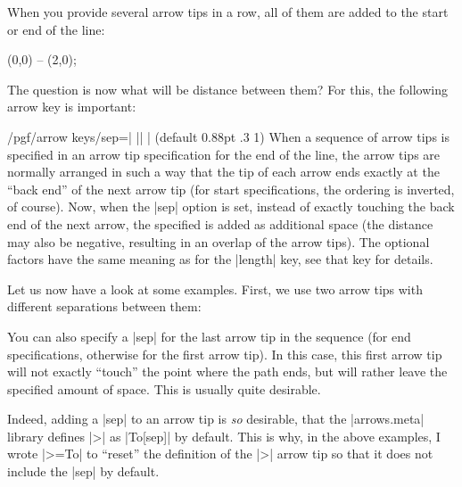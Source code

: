 When you provide several arrow tips in a row, all of them are added to
the start or end of the line:
\begin{codeexample}[]
\tikz \draw [<<<->>>>] (0,0) -- (2,0);
\end{codeexample}
The question is now what will be distance between them? For this, the
following arrow key is important:
\begin{key}{/pgf/arrow keys/sep=| || | (default 0.88pt .3 1)}
  When a sequence of arrow tips is specified in an arrow tip
  specification for the end of the line, the arrow tips are normally
  arranged in such a way that the tip of each arrow ends exactly at
  the ``back end'' of the next arrow tip (for start specifications,
  the ordering is inverted, of course). Now, when the |sep| option is
  set, instead of exactly touching the back end of the next arrow, the
  specified  is added as additional space (the
  distance may also be negative, resulting in an overlap of the arrow
  tips). The optional factors have the same meaning as for the
  |length| key, see that key for details.

  Let us now have a look at some examples. First, we use two arrow
  tips with different separations between them:
\begin{codeexample}[]
\end{codeexample}

  You can also specify a |sep| for the last arrow tip in the sequence
  (for end specifications, otherwise for the first arrow tip). In this
  case, this first arrow tip will not exactly ``touch'' the point
  where the path ends, but will rather leave the specified amount of
  space. This is usually quite desirable.
\begin{codeexample}[]
\end{codeexample}
  Indeed, adding a |sep| to an arrow tip is \emph{so} desirable, that
  the |arrows.meta| library defines |>| as |To[sep]| by default. This
  is why, in the above examples, I wrote |>=To| to ``reset'' the
  definition of the |>| arrow tip so that it does not include the
  |sep| by default. 


\end{key}
